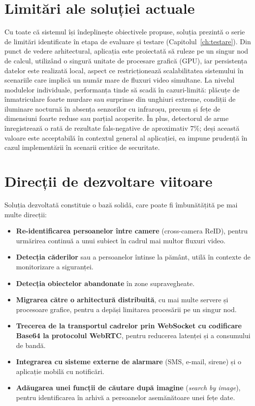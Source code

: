 \documentclass[../../main.tex]{subfiles}
\begin{document}
\section{Limitări ale soluției actuale}
\label{sec:limitari}

Cu toate că sistemul își îndeplinește obiectivele propuse, soluția prezintă o serie de limitări identificate în etapa de evaluare și testare (Capitolul~\ref{ch:testare}). Din punct de vedere arhitectural, aplicația este proiectată să ruleze pe un singur nod de calcul, utilizând o singură unitate de procesare grafică (GPU), iar persistența datelor este realizată local, aspect ce restricționează scalabilitatea sistemului în scenariile care implică un număr mare de fluxuri video simultane. La nivelul modulelor individuale, performanța tinde să scadă în cazuri-limită: plăcuțe de înmatriculare foarte murdare sau surprinse din unghiuri extreme, condiții de iluminare nocturnă în absența senzorilor cu infraroșu, precum și fețe de dimensiuni foarte reduse sau parțial acoperite. În plus, detectorul de arme înregistrează o rată de rezultate fals-negative de aproximativ $7\%$; deși această valoare este acceptabilă în contextul general al aplicației, ea impune prudență în cazul implementării în scenarii critice de securitate.

\section{Direcții de dezvoltare viitoare}
\label{sec:directii_viitoare}

Soluția dezvoltată constituie o bază solidă, care poate fi îmbunătățită pe mai multe direcții:

\begin{itemize}
    \item \textbf{Re-identificarea persoanelor între camere} (cross-camera ReID), pentru urmărirea continuă a unui subiect în cadrul mai multor fluxuri video.
    \item \textbf{Detecția căderilor} sau a persoanelor întinse la pământ, utilă în contexte de monitorizare a siguranței.
    \item \textbf{Detecția obiectelor abandonate} în zone supravegheate.
    \item \textbf{Migrarea către o arhitectură distribuită}, cu mai multe servere și procesoare grafice, pentru a depăși limitarea procesării pe un singur nod.
    \item \textbf{Trecerea de la transportul cadrelor prin WebSocket cu codificare Base64 la protocolul WebRTC}, pentru reducerea latenței și a consumului de bandă.
    \item \textbf{Integrarea cu sisteme externe de alarmare} (SMS, e-mail, sirene) și o aplicație mobilă cu notificări.
    \item \textbf{Adăugarea unei funcții de căutare după imagine} (\emph{search by image}), pentru identificarea în arhivă a persoanelor asemănătoare unei fețe date.
\end{itemize}
\end{document}
